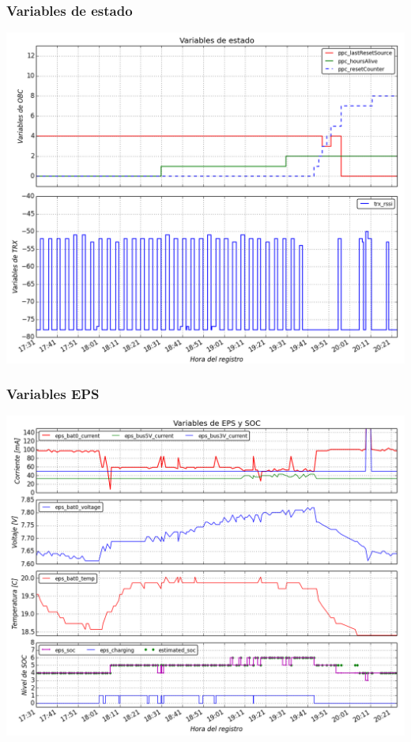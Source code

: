 \documentclass[xcolor=dvipsnames]{beamer}
\begin{document}
    \begin{frame}
        \frametitle{Variables de estado}
        \centering
        \includegraphics[height=0.99\textheight]{img/plot_status_var.png}
        
    \end{frame}
    
    \begin{frame}
        \frametitle{Variables EPS}
        \centering
        \includegraphics[height=0.99\textheight]{img/plot_soc.png}
        
    \end{frame}
    
\end{document}
